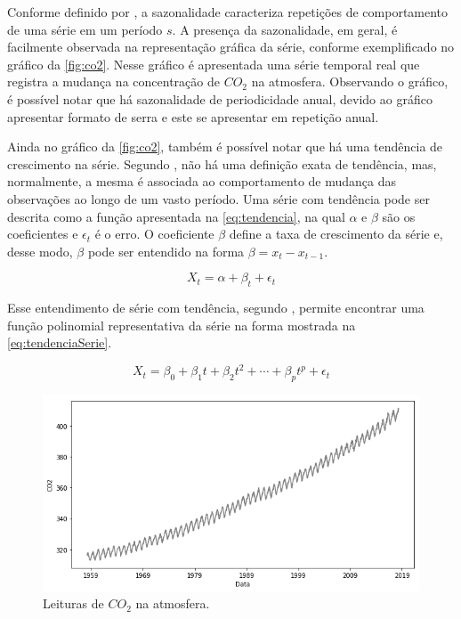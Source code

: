 \documentclass[
    12pt,
    oneside,
    a4paper,
    english,
    brazil
]{abntex2}
\begin{document}
Conforme   definido  por   ,   a  sazonalidade   caracteriza
repetições  de comportamento  de uma  série em  um período  $s$. A  presença da
sazonalidade,  em geral,  é facilmente  observada na  representação gráfica  da
série, conforme exemplificado no gráfico  da \autoref{fig:co2}. Nesse gráfico é
apresentada uma série  temporal real que registra a mudança  na concentração de
$CO_2$ na atmosfera. Observando o gráfico, é possível notar que há sazonalidade
de periodicidade anual, devido ao gráfico apresentar formato de serra e este se
apresentar em repetição anual.

Ainda  no  gráfico  da  \autoref{fig:co2},  também  é  possível  notar  que  há
uma  tendência de  crescimento na  série. Segundo  , não  há
uma  definição exata  de  tendência, mas, normalmente, a  mesma é associada  ao
comportamento  de  mudança  das  observações  ao longo  de  um  vasto  período.
Uma  série  com tendência  pode  ser  descrita  como  a função  apresentada  na
\autoref{eq:tendencia},  na  qual $\alpha$  e  $\beta$  são os  coeficientes  e
$\epsilon_t$ é  o erro. O coeficiente  $\beta$ define a taxa  de crescimento da
série  e, desse  modo, $\beta$  pode  ser entendido  na  forma $\beta  = x_t  -
x_{t-1}$.

\begin{equation}
    \label{eq:tendencia} X_t = \alpha + \beta_t + \epsilon_t
\end{equation}

Esse entendimento de série  com tendência, segundo , permite
encontrar uma  função polinomial representativa  da série na forma  mostrada na
\autoref{eq:tendenciaSerie}.

\begin{equation}
    \label{eq:tendenciaSerie}
    X_t = \beta_0 + \beta_1t + \beta_2t^2 + \cdots + \beta_{p}t^p + \epsilon_t
\end{equation}


\begin{figure}[ht]
    \centering
    \caption{Leituras de $CO_2$ na atmosfera.}\label{fig:co2}
    \includegraphics[width=.5\linewidth]{images/co2.png}
\end{figure}
\end{document}
